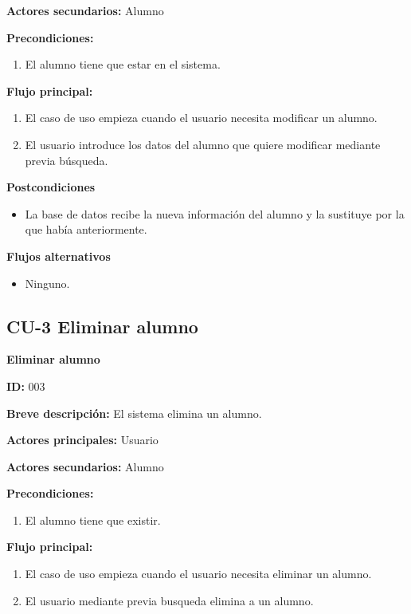 \textbf{Actores secundarios:} Alumno

\textbf{Precondiciones:}

\begin{enumerate}
	\item El alumno tiene que estar en el sistema.
\end{enumerate}

\textbf{Flujo principal:}

\begin{enumerate}
	\item El caso de uso empieza cuando el usuario necesita modificar un alumno.
	\item El usuario introduce los datos del alumno que quiere modificar mediante previa búsqueda.
\end{enumerate}

\textbf{Postcondiciones}

\begin{itemize}
	\item La base de datos recibe la nueva información del alumno y la sustituye por la que había anteriormente.
\end{itemize}

\textbf{Flujos alternativos}

\begin{itemize}
	\item Ninguno.
\end{itemize}

\newpage
\subsection{CU-3 Eliminar alumno}
\textbf{Eliminar alumno}

\textbf{ID:} 003

\textbf{Breve descripción:} El sistema elimina un alumno.

\textbf{Actores principales:} Usuario

\textbf{Actores secundarios:} Alumno

\textbf{Precondiciones:}

\begin{enumerate}
	\item El alumno tiene que existir.
\end{enumerate}

\textbf{Flujo principal:}

\begin{enumerate}
	\item El caso de uso empieza cuando el usuario necesita eliminar un alumno.
	\item El usuario mediante previa busqueda elimina a un alumno.
\end{enumerate}

